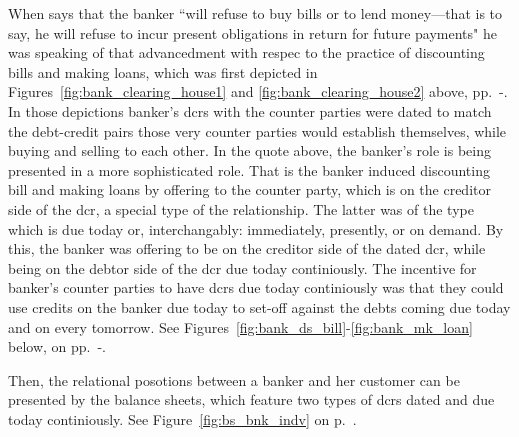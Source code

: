 When \citeauthor{innes1913} says that the banker ``will refuse to buy bills or to lend money---that is to say, he will
refuse to incur present obligations in return for future payments" he was speaking of that advancedment with respec to the practice of discounting bills and making loans, which was first depicted in Figures~\ref{fig:bank_clearing_house1} and \ref{fig:bank_clearing_house2} above, pp.~\pageref{fig:bank_clearing_house1}-\pageref{fig:bank_clearing_house2}. In those depictions banker's \acfp{dcr} with the counter parties were dated to match the debt-credit pairs those very counter parties would establish themselves, while buying and selling to each other. In the quote above, the banker's role is being presented in a more sophisticated role. That is the banker induced discounting bill and making loans by offering to the counter party, which is on the creditor side of the \acf{dcr}, a special type of the relationship. The latter was of the type which is due today or, interchangably: immediately, presently, or on demand. By this, the banker was offering to be on the creditor side of the dated \ac{dcr}, while being on the debtor side of the \ac{dcr} due today continiously. The incentive for banker's counter parties to have \acp{dcr} due today continiously was that they could use credits on the banker due today to set-off against the debts coming due today and on every tomorrow.  See Figures~\ref{fig:bank_ds_bill}-\ref{fig:bank_mk_loan} below, on pp.~\pageref{fig:bank_ds_bill}-\pageref{fig:bank_mk_loan}. 

Then, the relational posotions between a banker and her customer can be presented by the balance sheets, which feature two types of \acfp{dcr} dated and due today continiously. See Figure~\ref{fig:bs_bnk_indv} on p.~\pageref{fig:bs_bnk_indv}. 

